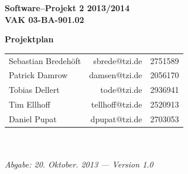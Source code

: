 \documentclass[fontsize=12pt,paper=a4,twoside]{scrartcl}
\begin{document}
  \thispagestyle{fancy}
  \fancyhead[LO,RE]{ }
  \fancyfoot[C]{}

  \vspace{3cm}

  \begin{minipage}[H]{\textwidth}
  \begin{center}
  \bf
  \Large
  Software--Projekt 2 2013/2014\\
  \smallskip
  \small
  VAK 03-BA-901.02\\
  \vspace{3cm}
  \end{center}
  \end{minipage}
  \begin{minipage}[H]{\textwidth}
  \begin{center}
  \vspace{1cm}
  \bf
  \Large Projektplan\\
  \vfill
  \end{center}
  \end{minipage}
  \vfill
  \begin{minipage}[H]{\textwidth}
  \begin{center}
  \sf
  \begin{tabular}{lrr}
  Sebastian Bredehöft & sbrede@tzi.de & 2751589\\
  Patrick Damrow & damsen@tzi.de & 2056170\\
  Tobias Dellert & tode@tzi.de & 2936941\\
  Tim Ellhoff & tellhoff@tzi.de & 2520913\\
  Daniel Pupat & dpupat@tzi.de & 2703053\\
  
  \end{tabular}
  \\ ~
  \vspace{2cm}
  \\
  \it Abgabe: 20. Oktober. 2013 --- Version 1.0\\ ~
  \end{center}
  \end{minipage}



\newpage
\end{document}

